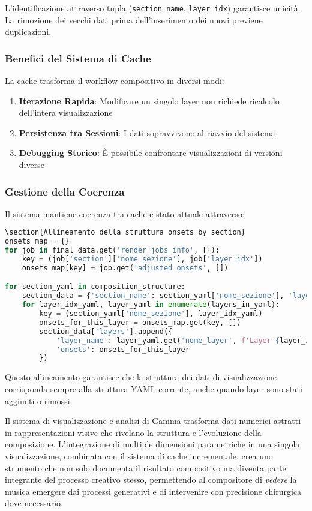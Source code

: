 L'identificazione attraverso tupla (\texttt{section\_name}, \texttt{layer\_idx}) garantisce unicità. La rimozione dei vecchi dati prima dell'inserimento dei nuovi previene duplicazioni.
\subsubsection{Benefici del Sistema di Cache}
La cache trasforma il workflow compositivo in diversi modi:

\begin{enumerate}
    \item \textbf{Iterazione Rapida}: Modificare un singolo layer non richiede ricalcolo dell'intera visualizzazione
    \item \textbf{Persistenza tra Sessioni}: I dati sopravvivono al riavvio del sistema
    \item \textbf{Debugging Storico}: È possibile confrontare visualizzazioni di versioni diverse
\end{enumerate}
\subsubsection{Gestione della Coerenza}
Il sistema mantiene coerenza tra cache e stato attuale attraverso:

\begin{lstlisting}[language=Python]
\section{Allineamento della struttura onsets_by_section}
onsets_map = {}
for job in final_data.get('render_jobs_info', []):
    key = (job['section']['nome_sezione'], job['layer_idx'])
    onsets_map[key] = job.get('adjusted_onsets', [])

for section_yaml in composition_structure:
    section_data = {'section_name': section_yaml['nome_sezione'], 'layers': []}
    for layer_idx_yaml, layer_yaml in enumerate(layers_in_yaml):
        key = (section_yaml['nome_sezione'], layer_idx_yaml)
        onsets_for_this_layer = onsets_map.get(key, [])
        section_data['layers'].append({
            'layer_name': layer_yaml.get('nome_layer', f'Layer {layer_idx_yaml+1}'),
            'onsets': onsets_for_this_layer
        })
\end{lstlisting}

Questo allineamento garantisce che la struttura dei dati di visualizzazione corrisponda sempre alla struttura YAML corrente, anche quando layer sono stati aggiunti o rimossi.

Il sistema di visualizzazione e analisi di Gamma trasforma dati numerici astratti in rappresentazioni visive che rivelano la struttura e l'evoluzione della composizione. L'integrazione di multiple dimensioni parametriche in una singola visualizzazione, combinata con il sistema di cache incrementale, crea uno strumento che non solo documenta il risultato compositivo ma diventa parte integrante del processo creativo stesso, permettendo al compositore di \textit{vedere} la musica emergere dai processi generativi e di intervenire con precisione chirurgica dove necessario.